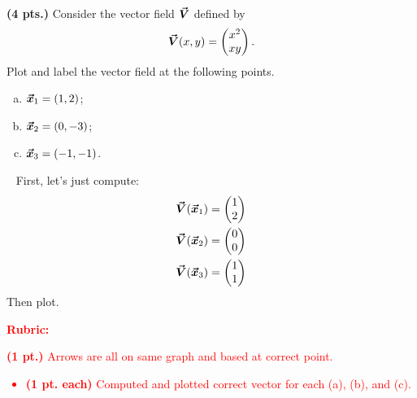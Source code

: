 \documentclass[12pt]{article} %
\begin{document}
\newpage
\begin{problem}
\textbf{(4 pts.)} Consider the vector field $\boldsymbol{\vec{V}}$ defined by
    \[
        \boldsymbol{\vec{V}}(x,y) = \begin{pmatrix} x^2 \\ xy \end{pmatrix}.
    \]
    Plot and label the vector field at the following points.
\begin{enumerate}[(a)]
    \item $\boldsymbol{\vec{x}}_1 = (1,2)$;
    \item $\boldsymbol{\vec{x}}_2 = (0,-3)$;
    \item $\boldsymbol{\vec{x}}_3 = (-1,-1)$.
\end{enumerate}
\end{problem}
\begin{solution}~
First, let's just compute:
\begin{align*}
    \boldsymbol{\vec{V}}(\boldsymbol{\vec{x}}_1) = \begin{pmatrix} 1 \\ 2 \end{pmatrix} \\
    \boldsymbol{\vec{V}}(\boldsymbol{\vec{x}}_2) = \begin{pmatrix} 0 \\ 0 \end{pmatrix} \\
    \boldsymbol{\vec{V}}(\boldsymbol{\vec{x}}_3) = \begin{pmatrix} 1 \\ 1 \end{pmatrix} \\
\end{align*}
Then plot.
    \begin{center}
        \end{center}
\end{solution}
\textcolor{red}{
\noindent \textbf{Rubric:}}
\textcolor{red}{
\textbf{(1 pt.)} Arrows are all on same graph and based at correct point.
\begin{itemize}
\item \textbf{(1 pt. each)} Computed and plotted correct vector for each (a), (b), and (c).
\end{itemize}
}
\end{document}
